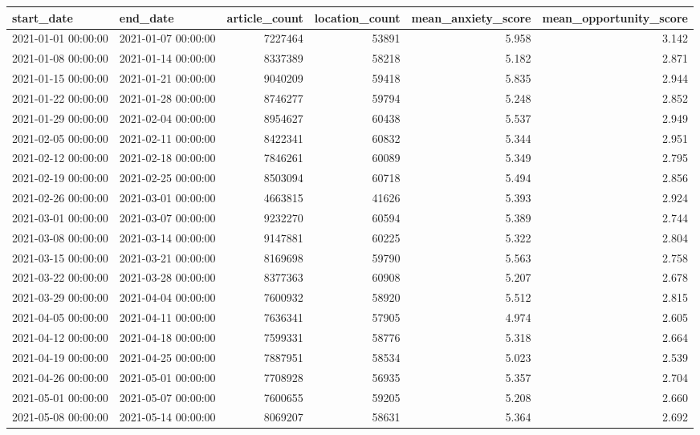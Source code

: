 \begin{tabular}{llrrrr}
\toprule
start\_date & end\_date & article\_count & location\_count & mean\_anxiety\_score & mean\_opportunity\_score \\
\midrule
2021-01-01 00:00:00 & 2021-01-07 00:00:00 & 7227464 & 53891 & 5.958 & 3.142 \\
2021-01-08 00:00:00 & 2021-01-14 00:00:00 & 8337389 & 58218 & 5.182 & 2.871 \\
2021-01-15 00:00:00 & 2021-01-21 00:00:00 & 9040209 & 59418 & 5.835 & 2.944 \\
2021-01-22 00:00:00 & 2021-01-28 00:00:00 & 8746277 & 59794 & 5.248 & 2.852 \\
2021-01-29 00:00:00 & 2021-02-04 00:00:00 & 8954627 & 60438 & 5.537 & 2.949 \\
2021-02-05 00:00:00 & 2021-02-11 00:00:00 & 8422341 & 60832 & 5.344 & 2.951 \\
2021-02-12 00:00:00 & 2021-02-18 00:00:00 & 7846261 & 60089 & 5.349 & 2.795 \\
2021-02-19 00:00:00 & 2021-02-25 00:00:00 & 8503094 & 60718 & 5.494 & 2.856 \\
2021-02-26 00:00:00 & 2021-03-01 00:00:00 & 4663815 & 41626 & 5.393 & 2.924 \\
2021-03-01 00:00:00 & 2021-03-07 00:00:00 & 9232270 & 60594 & 5.389 & 2.744 \\
2021-03-08 00:00:00 & 2021-03-14 00:00:00 & 9147881 & 60225 & 5.322 & 2.804 \\
2021-03-15 00:00:00 & 2021-03-21 00:00:00 & 8169698 & 59790 & 5.563 & 2.758 \\
2021-03-22 00:00:00 & 2021-03-28 00:00:00 & 8377363 & 60908 & 5.207 & 2.678 \\
2021-03-29 00:00:00 & 2021-04-04 00:00:00 & 7600932 & 58920 & 5.512 & 2.815 \\
2021-04-05 00:00:00 & 2021-04-11 00:00:00 & 7636341 & 57905 & 4.974 & 2.605 \\
2021-04-12 00:00:00 & 2021-04-18 00:00:00 & 7599331 & 58776 & 5.318 & 2.664 \\
2021-04-19 00:00:00 & 2021-04-25 00:00:00 & 7887951 & 58534 & 5.023 & 2.539 \\
2021-04-26 00:00:00 & 2021-05-01 00:00:00 & 7708928 & 56935 & 5.357 & 2.704 \\
2021-05-01 00:00:00 & 2021-05-07 00:00:00 & 7600655 & 59205 & 5.208 & 2.660 \\
2021-05-08 00:00:00 & 2021-05-14 00:00:00 & 8069207 & 58631 & 5.364 & 2.692 \\

\end{tabular}

